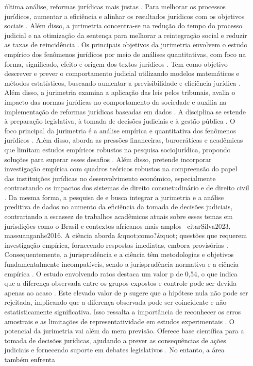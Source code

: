 última análise, reformas jurídicas mais justas \cite{massuanganhe2016, maia2019}. Para melhorar os processos jurídicos, aumentar a eficiência e alinhar os resultados jurídicos com os objetivos sociais \cite{massuanganhe2016, luvizotto2020}. Além disso, a jurimetria concentra-se na redução do tempo do processo judicial e na otimização da sentença para melhorar a reintegração social e reduzir as taxas de reincidência \cite{nunes2018}. Os principais objetivos da jurimetria envolvem o estudo empírico dos fenômenos jurídicos por meio de análises quantitativas, com foco na forma, significado, efeito e origem dos textos jurídicos \cite{de2010}. Tem como objetivo descrever e prever o comportamento judicial utilizando modelos matemáticos e métodos estatísticos, buscando aumentar a previsibilidade e eficiência jurídica \cite{loevinger1949, nunes2018}. Além disso, a jurimetria examina a aplicação das leis pelos tribunais, avalia o impacto das normas jurídicas no comportamento da sociedade e auxilia na implementação de reformas jurídicas baseadas em dados \cite{nunes2018, nunes2018, massuanganhe2016}. A disciplina se estende à preparação legislativa, à tomada de decisões judiciais e à gestão pública \cite{zabala1809}. O foco principal da jurimetria é a análise empírica e quantitativa dos fenômenos jurídicos \cite{calvo2024, calvo2024}. Além disso, aborda as pressões financeiras, burocráticas e acadêmicas que limitam estudos empíricos robustos na pesquisa sociojurídica, propondo soluções para superar esses desafios \cite{calvo2024}. Além disso, \cite{borges2015} pretende incorporar investigação empírica com quadros teóricos robustos na compreensão do papel das instituições jurídicas no desenvolvimento económico, especialmente contrastando os impactos dos sistemas de direito consuetudinário e de direito civil \cite{borges2015, borges2015}. Da mesma forma, a pesquisa de \cite{Silva2023} e \cite{massuanganhe2016} busca integrar a jurimetria e a análise preditiva de dados no aumento da eficiência da tomada de decisões judiciais, contrariando a escassez de trabalhos acadêmicos atuais sobre esses temas em jurisdições como o Brasil e contextos africanos mais amplos \ citar{Silva2023, massuanganhe2016}. A ciência aborda &quot;como?&quot; questões que requerem investigação empírica, fornecendo respostas imediatas, embora provisórias \cite{loevinger1949}. Consequentemente, a jurisprudência e a ciência têm metodologias e objetivos fundamentalmente incompatíveis, sendo a jurisprudência normativa e a ciência empírica \cite{loevinger1949}. O estudo envolvendo ratos destaca um valor p de 0,54, o que indica que a diferença observada entre os grupos expostos e controle pode ser devida apenas ao acaso \cite{nunes2018}. Este elevado valor de p sugere que a hipótese nula não pode ser rejeitada, implicando que a diferença observada pode ser coincidente e não estatisticamente significativa. Isso ressalta a importância de reconhecer os erros amostrais e as limitações de representatividade em estudos experimentais \cite{nunes2018}. O potencial da jurimetria vai além da mera previsão. Oferece base científica para a tomada de decisões jurídicas, ajudando a prever as consequências de ações judiciais e fornecendo suporte em debates legislativos \cite{nunes2016jurimetria, por2013}. No entanto, a área também enfrenta 